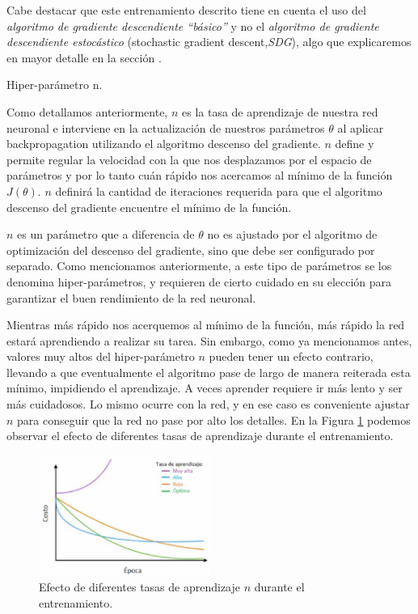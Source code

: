 \documentclass[12pt,a4paper]{article}
\makeatletter
\renewcommand\paragraph{\@startsection{paragraph}{4}{\z@}
            {-2.5ex\@plus -1ex \@minus -.25ex}
            {1.25ex \@plus .25ex}
            {\normalfont\normalsize\bfseries}}
\makeatother
\begin{document}
\begin{sloppypar}
\begin{enumerate}
\end{enumerate}

Cabe destacar que este entrenamiento descrito tiene en cuenta el uso del \textit{algoritmo de gradiente descendiente “básico”} y no el \textit{algoritmo de gradiente descendiente estocástico} (stochastic gradient descent,\textit{SDG}), algo que explicaremos en mayor detalle en la sección \textit{}.

\paragraph{Hiper-parámetro n.}\label{hiper_n}

Como detallamos anteriormente, $n$ es la tasa de aprendizaje de nuestra red neuronal e interviene en la actualización de nuestros parámetros  $\theta$ al aplicar backpropagation utilizando el algoritmo descenso del gradiente. $n$ define y permite regular la velocidad con la que nos desplazamos por el espacio de parámetros y por lo tanto cuán rápido nos acercamos al mínimo de la función $J(\theta)$. $n$ definirá la cantidad de iteraciones requerida para que el algoritmo descenso del gradiente encuentre el mínimo de la función.

$n$ es un parámetro que a diferencia de $\theta$ no es ajustado por el algoritmo de optimización del descenso del gradiente, sino que debe ser configurado por separado. Como mencionamos anteriormente, a este tipo de parámetros se los denomina hiper-parámetros, y requieren de cierto cuidado en su elección para garantizar el buen rendimiento de la red neuronal. 

Mientras más rápido nos acerquemos al mínimo de la función, más rápido la red estará aprendiendo a realizar su tarea. Sin embargo, como ya mencionamos antes, valores muy altos del hiper-parámetro $n$ pueden tener un efecto contrario, llevando a que eventualmente el algoritmo pase de largo de manera reiterada esta mínimo, impidiendo el aprendizaje. A veces aprender requiere ir más lento y ser más cuidadosos. Lo mismo ocurre con la red, y en ese caso es conveniente ajustar $n$ para conseguir que la red no pase por alto los detalles. En la Figura \ref{fig:ann_6} podemos observar el efecto de diferentes tasas de aprendizaje durante el entrenamiento. 

\begin{figure}[H]    %
 \centering
 \includegraphics[width=0.5\textwidth]{images/ANN/6-ANN.png}
  \captionsetup{justification=centering,margin=3cm}
 \caption{Efecto de diferentes tasas de aprendizaje $n$ durante el entrenamiento\cite{ANN_25}.} 
 \label{fig:ann_6}
\end{figure}


\end{sloppypar}
\end{document}
